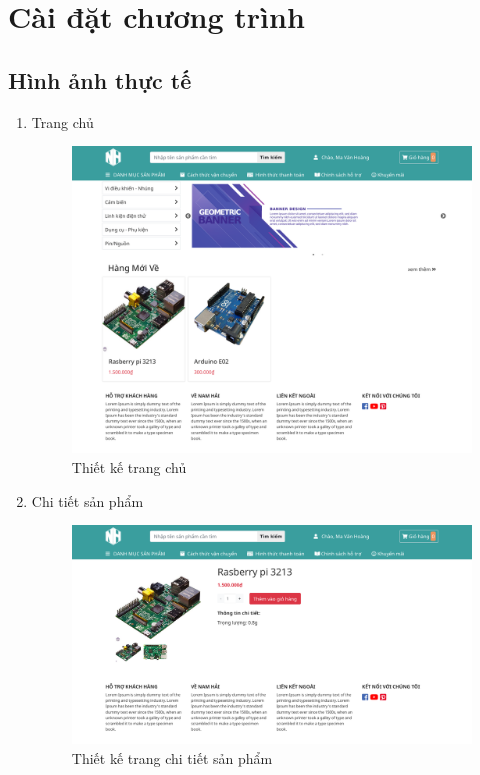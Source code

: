 \chapter{Cài đặt chương trình}
\section{Hình ảnh thực tế}
\begin{enumerate}[label=\textbf{\alph*)}]
	\item Trang chủ
	      \begin{figure}[h!]
		      \includegraphics[scale=0.27]{fig/r_home.png}
		      \caption{Thiết kế trang chủ}
	      \end{figure}
	\item Chi tiết sản phẩm
	      \begin{figure}[h!]
		      \includegraphics[scale=0.27]{fig/r_product_details.png}
		      \caption{Thiết kế trang chi tiết sản phẩm}

\end{figure}
\end{enumerate}
